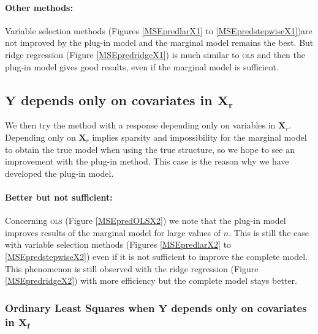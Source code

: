 \documentclass[12pt,a4paper]{report}
\begin{document}
\paragraph{Other methods:} Variable selection methods (Figures \ref{MSEpredlarX1} to \ref{MSEpredstepwiseX1})are not improved by the plug-in model and the marginal model remains the best. But ridge regression (Figure \ref{MSEpredridgeX1}) is much similar to \textsc{ols} and then the plug-in model gives good results, even if the marginal model is sufficient.


	 \subsection{$\boldsymbol{Y}$ depends only on covariates in $\boldsymbol{X_{r}}$ }
 \label{tableMSEsimgauchepred}
We then try the method with a response depending only on variables in $\boldsymbol{X}_r$. 
Depending only on $\boldsymbol{X}_r$ implies sparsity and impossibility for the marginal model to obtain the true model when using the true structure, so we hope to see an improvement with the plug-in method. This case is the reason why we have developed the plug-in model. \\

\paragraph{Better but not sufficient:} Concerning \textsc{ols} (Figure \ref{MSEpredOLSX2}) we note that the plug-in model improves results of the marginal model for large values of $n$. This is still the case with variable selection methods (Figures \ref{MSEpredlarX2} to \ref{MSEpredstepwiseX2}) even if it is not sufficient to improve the complete model. This phenomenon is still observed with the ridge regression (Figure \ref{MSEpredridgeX2}) with more efficiency but the complete model stays better.\\

	

 
 
\FloatBarrier

\newpage
	\setcellgapes{1pt}
\subsubsection{Ordinary Least Squares when $\boldsymbol{Y}$ depends only on covariates in $\boldsymbol{X_f}$}
\end{document}

